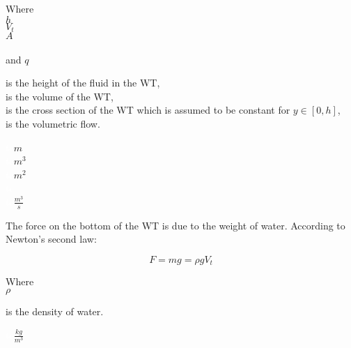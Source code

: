 \begin{minipage}[t]{0.20\textwidth}
Where\\
\hspace*{8mm} $h$ \\
\hspace*{8mm} $V_t$ \\
\hspace*{8mm} $A$ \\
\hspace*{8mm} \\
and \hspace*{0.7mm} $q$ \\
\end{minipage}
\begin{minipage}[t]{0.68\textwidth}
\vspace*{2mm}
is the height of the fluid in the WT,\\
is the volume of the WT,\\
is the cross section of the WT which is assumed to be constant for $y \in [0,h]$,\\
is the volumetric flow.
\end{minipage}
\begin{minipage}[t]{0.10\textwidth}
\vspace*{2mm}
\textcolor{White}{te}$\unit{m}$\\
\textcolor{White}{te}$\unit{m^3}$\\
\textcolor{White}{te}$\unit{m^2}$\\
\textcolor{White}{te}\\
\textcolor{White}{te}$\unit{\frac{m^3}{s}}$
\end{minipage}

The force on the bottom of the WT is due to the weight of water. According to Newton's second law: 

\begin{equation}
  F = mg = \rho g V_t
  \label{Newton_WT}
\end{equation}

  \begin{minipage}[t]{0.20\textwidth}
Where\\
\hspace*{8mm} $\rho$ 
\end{minipage}
\begin{minipage}[t]{0.68\textwidth}
\vspace*{2mm}
is the density of water.
\end{minipage}
\begin{minipage}[t]{0.10\textwidth}
\vspace*{2mm}
\textcolor{White}{te}$\unit{\frac{kg}{m^3}}$
\end{minipage}


